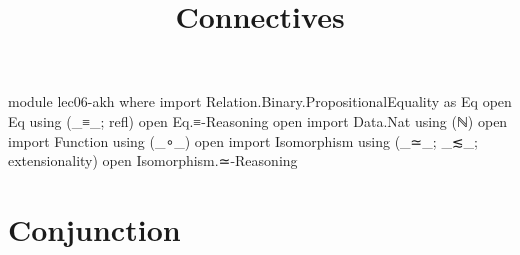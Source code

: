 \documentclass{lecturenotes}
\title{Connectives}
\begin{document}
\maketitle

\begin{code}
module lec06-akh where
import Relation.Binary.PropositionalEquality as Eq
open Eq using (_≡_; refl)
open Eq.≡-Reasoning
open import Data.Nat using (ℕ)
open import Function using (_∘_)
open import Isomorphism using (_≃_; _≲_; extensionality)
open Isomorphism.≃-Reasoning
\end{code}

\section{Conjunction}
\label{sec:conjunction}
\end{document}
